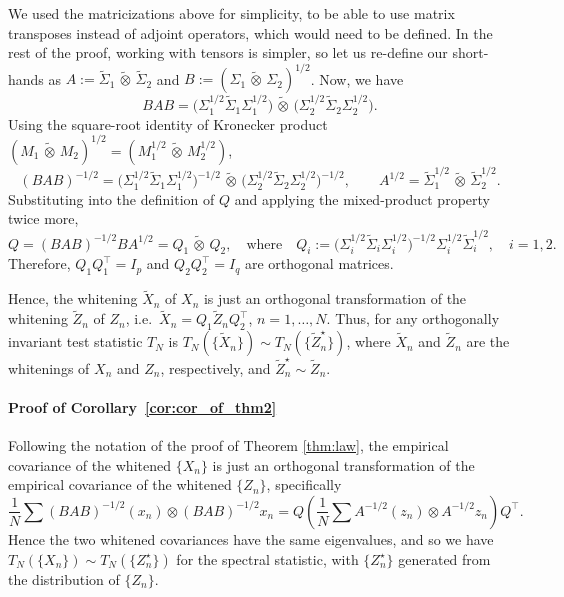 \documentclass[12pt]{article}
\newcommand{\ot}{\,\tilde\otimes\,}
\begin{document}
We used the matricizations above for simplicity, to be able to use matrix transposes instead of adjoint operators, which would need to be defined. In the rest of the proof, working with tensors is simpler, so let us re-define our short-hands as $A:=\widetilde\Sigma_1\ot\widetilde\Sigma_2$ and $B := (\Sigma_1\ot\Sigma_2)^{1/2}$. Now, we have
\[
    BAB = \big(\Sigma_1^{1/2}\widetilde\Sigma_1\Sigma_1^{1/2}\big) \ot \big(\Sigma_2^{1/2}\widetilde\Sigma_2\Sigma_2^{1/2}\big).
\]
    Using the square-root identity of Kronecker product $(M_1\ot M_2)^{1/2} = (M_1^{1/2}\ot M_2^{1/2})$,
\[
    (BAB)^{-1/2} = \big(\Sigma_1^{1/2}\widetilde\Sigma_1\Sigma_1^{1/2}\big)^{-1/2} \ot \big(\Sigma_2^{1/2}\widetilde\Sigma_2\Sigma_2^{1/2}\big)^{-1/2}, \qquad A^{1/2} = \widetilde\Sigma_1^{1/2} \ot \widetilde\Sigma_2^{1/2}.
\]
    Substituting into the definition of $Q$ and applying the mixed-product property twice more,
\[
    Q = (BAB)^{-1/2}BA^{1/2} = Q_1 \ot Q_2, \quad\text{where}\quad Q_i := \big(\Sigma_i^{1/2}\widetilde\Sigma_i\Sigma_i^{1/2}\big)^{-1/2}\Sigma_i^{1/2}\widetilde\Sigma_i^{1/2}, \quad i=1,2.
\]
Therefore, $Q_1Q_1^\top=I_p$ and $Q_2Q_2^\top=I_q$ are orthogonal matrices.

Hence, the whitening $\widetilde X_n$ of $X_n$ is just an orthogonal transformation of the whitening $\widetilde Z_n$ of $Z_n$, i.e.~$\widetilde X_n=Q_1\widetilde Z_nQ_2^\top$, $n=1,\dots,N$. Thus, for any orthogonally invariant test statistic $T_N$
is $T_N(\{\tilde X_n\})\sim T_N(\{\tilde Z_n^\star\})$, where $\tilde X_n$ and $\tilde Z_n$ are the whitenings of $X_n$ and $Z_n$, respectively, and $\tilde Z_n^\star\sim \tilde Z_n$.

\paragraph{Proof of Corollary~\ref{cor:cor_of_thm2}
} Following the notation of the proof of Theorem \ref{thm:law}, the empirical covariance of the whitened $\{X_n\}$ is just an orthogonal transformation of the empirical covariance of the whitened $\{Z_n\}$, specifically
\begin{equation}\label{eq:invariance}
\frac{1}{N} \sum (BAB)^{-1/2}(x_n) \otimes (BAB)^{-1/2}x_n
= Q \left(\frac{1}{N} \sum A^{-1/2}(z_n) \otimes A^{-1/2}z_n\right) Q^\top.
\end{equation}
Hence the two whitened covariances have the same eigenvalues, and so we have $T_N(\{X_n\}) \sim T_N(\{Z_n^\star\})$ for the spectral statistic, with $\{Z_n^\star\}$ generated from the distribution of $\{Z_n\}$. 
\end{document}
